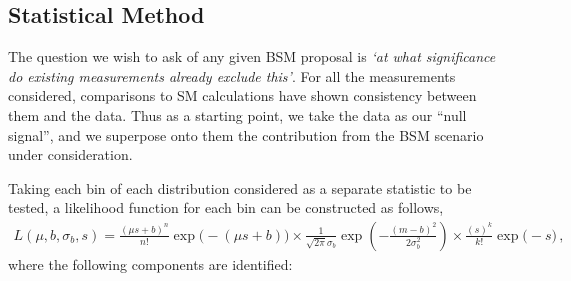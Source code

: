 \documentclass[floatfix]{article}
\begin{document}
\subsection{Statistical Method}\label{sec:statmethod}


The question we wish to ask of any given BSM proposal is {\it `at what significance do existing measurements already exclude this'}. 
For all the measurements considered, comparisons to SM calculations have shown consistency between them and the data. Thus as a starting point, we take the
data as our ``null signal'', and we superpose onto them the contribution from the BSM scenario under consideration.

Taking each bin of each distribution considered as a separate statistic to be tested, a likelihood function for each bin can be constructed as follows, 
\begin{align}
L(\mu, {b}, {\sigma}_{b}, {s}) = { \frac{(\mu s + b)^{n}}{n!} \exp\big(-(\mu s + b)\big) \times \frac{1}{\sqrt{2 \pi} \sigma_{b}} \exp\left(-\frac{(m - b)^{2}}{2 \sigma_{b}^{2}}\right)} \times \frac{(s)^{k}}{k!}\exp\big(-s\big)\,,
\end{align}
where the following components are identified:
\end{document}
